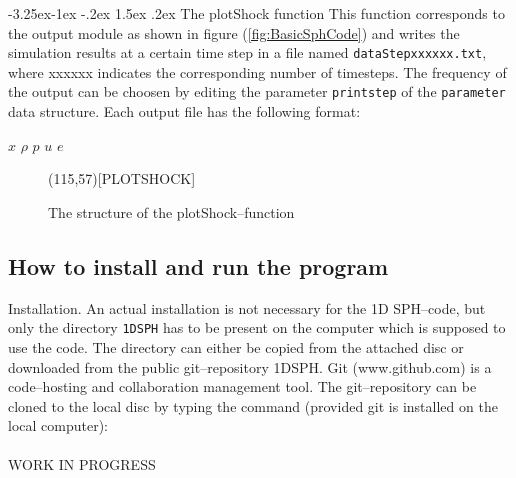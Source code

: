 \documentclass{report}
\makeatletter
\renewcommand\paragraph{\@startsection{paragraph}{4}{\z@}%
  {-3.25ex\@plus -1ex \@minus -.2ex}%
  {1.5ex \@plus .2ex}%
  {\normalfont\normalsize\bfseries}}
\makeatother
\begin{document}
\paragraph{The plotShock function}
This function corresponds to the output module as shown in figure  (\ref{fig:BasicSphCode}) and writes the simulation results at a certain time step in a file named {\tt dataStepxxxxxx.txt}, where xxxxxx indicates the corresponding number of timesteps. The frequency of the output can be choosen by editing the parameter {\tt printstep} of the {\tt parameter} data structure. Each output file has the following format:

$x$ $\rho$ $p$ $u$ $e$

\begin{figure}[H]
\label{fig:plotShock_structure}  

\begin{center}
\sProofOn
\begin{struktogramm}(115,57)[PLOTSHOCK]
  \whileend
\end{struktogramm}
\sProofOff
\end{center}

\caption{The structure of the plotShock--function}
\end{figure}

\subsection{How to install and run the program}
Installation.
An actual installation is not necessary for the 1D SPH--code, but only the directory {\tt 1DSPH} has to be present on the computer which is supposed to use the code. The directory can either be copied from the attached disc or downloaded from the public git--repository 1DSPH. Git (www.github.com) is a code--hosting and collaboration management tool. The git--repository can be cloned to the local disc by typing the command (provided git is installed on the local computer):
\\
\\
WORK IN PROGRESS
\end{document}
